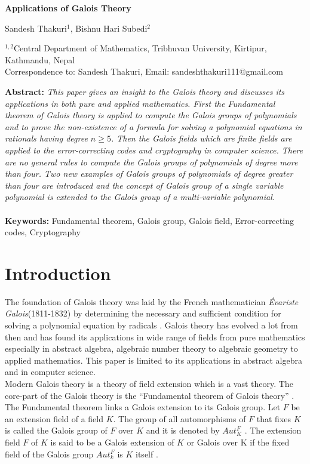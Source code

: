 \documentclass[a4paper,twoside,10pt]{article}
\theoremstyle{plain}
\theoremstyle{definition}
\begin{document}
\linenumbers
{\Large
\begin{center}
\bf{\LARGE Applications of Galois Theory}
\end{center}}
\begin{center}
Sandesh Thakuri$^{1}$, Bishnu Hari Subedi$^{2}$
\end{center}

\begin{center}
{\footnotesize
$^{1,2}$Central Department of Mathematics, Tribhuvan University, Kirtipur, Kathmandu, Nepal \\[1mm]
Correspondence to: Sandesh Thakuri, Email: sandeshthakuri111@gmail.com
}
\end{center}

\noindent
\textbf{Abstract:} {\it This paper gives an insight to the Galois theory and discusses its applications in both pure and applied mathematics. First the Fundamental theorem of Galois theory is applied to compute the Galois groups of polynomials and to prove the non-existence of a formula for solving a polynomial equations in rationals having degree \(n \geq 5\). Then the Galois fields which are finite fields are applied to the error-correcting codes and cryptography in computer science. There are no general rules to compute the Galois groups of polynomials of degree more than four. Two new examples of Galois groups of polynomials of degree greater than four are introduced and the concept of Galois group of a single variable polynomial is extended to the Galois group of a multi-variable polynomial.}\\\\
\textbf{Keywords:} Fundamental theorem, Galois group, Galois field, Error-correcting codes, Cryptography

\section{Introduction}
The foundation of Galois theory was laid by the French mathematician \textit{Évariste Galois}(1811-1832) by determining the necessary and sufficient condition for solving a polynomial equation by radicals \cite{galois}. Galois theory has evolved a lot from then and has found its applications in wide range of fields from pure mathematics especially in abstract algebra, algebraic number theory to algebraic geometry to applied mathematics. This paper is limited to its applications in abstract algebra and in computer science. \\[2mm]
Modern Galois theory is a theory of field extension which is a vast theory. The core-part of the Galois theory is the ``Fundamental theorem of Galois theory'' \cite {hunger}. The Fundamental theorem links a Galois extension to its Galois group. Let \(F\) be an extension field of a field \(K\). The group of all automorphisms of \(F\) that fixes \(K\) is called the Galois group of \(F\) over \(K\) and it is denoted by \(Aut_K^F\) \cite{hunger}. The extension field \(F\) of \(K\) is said to be a Galois extension of \(K\) or Galois over K if the fixed field of the Galois group \(Aut_k^F\) is \(K\) itself \cite{hunger}.
\end{document}
